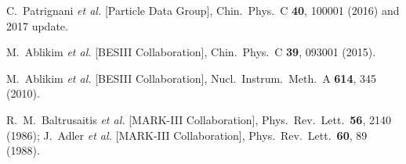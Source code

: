\begin{thebibliography}{99}


%
  
  C.~Patrignani {\it et al.} [Particle Data Group],
  Chin.\ Phys.\ C {\bf 40}, 100001 (2016) and 2017 update.

  M.~Ablikim {\it et al.} [BESIII Collaboration],
  Chin.\ Phys.\ C {\bf 39}, 093001 (2015).


		M.~Ablikim {\it et al.}  [BESIII Collaboration],
Nucl.\ Instrum.\ Meth.\ A {\bf 614}, 345 (2010).

R.~M.~Baltrusaitis {\it et al.} [MARK-III Collaboration],
  Phys.\ Rev.\ Lett.\  {\bf 56}, 2140 (1986);
J.~Adler {\it et al.} [MARK-III Collaboration],
  Phys.\ Rev.\ Lett.\  {\bf 60}, 89 (1988).
    

\end{thebibliography}
